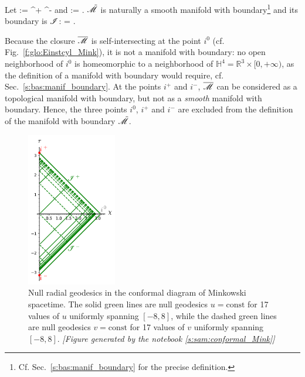 Let
\be
    \scri := \scri^+ \cup \scri^-
\ee
and
\be \label{e:glo:def_tM_Mink}
    \tilde{\M} := \M \cup \scri .
\ee
$\tilde{\mathscr{M}}$ is naturally a smooth manifold with
boundary\footnote{Cf. Sec.~\ref{s:bas:manif_boundary} for the precise definition.}
and its boundary is $\mathscr{I}$:
\be
    \partial \tilde{\M} = \scri.
\ee
\begin{remark}
Because the closure $\overline{\mathscr{M}}$ is self-intersecting at the point $i^0$
(cf. Fig.~\ref{f:glo:Einstcyl_Mink}), it is not a manifold with boundary: no open neighborhood of
$i^0$ is homeomorphic to a neighborhood of
$\mathbb{H}^4 = \mathbb{R}^3\times {[0,+\infty)}$,
as the definition of a manifold with boundary would
require, cf. Sec.~\ref{s:bas:manif_boundary}.
At the points $i^+$ and $i^-$, $\overline{\mathscr{M}}$ can be considered as a
topological manifold with boundary, but not as a \emph{smooth} manifold with boundary.
Hence, the three points $i^0$, $i^+$ and $i^-$ are excluded from the definition
of the manifold with boundary $\tilde{\mathscr{M}}$.
\end{remark}

\begin{figure}
\centerline{\includegraphics[width=0.35\textwidth]{glo_conf_Mink_null.pdf}}
\caption[]{\label{f:glo:conf_Mink_null}\footnotesize
Null radial geodesics in the conformal diagram of Minkowski spacetime.
The solid green lines are null geodesics $u=\mathrm{const}$ for
17 values of $u$ uniformly spanning $[-8,8]$, while the dashed green lines are
null geodesics $v=\mathrm{const}$ for 17 values of $v$ uniformly spanning $[-8,8]$.
\textsl{[Figure generated by the notebook \ref{s:sam:conformal_Mink}]}
}
\end{figure}


